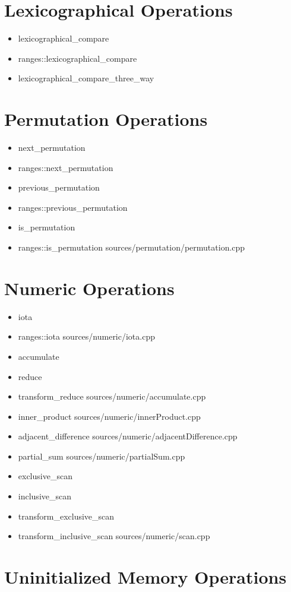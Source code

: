\documentclass{article}
\begin{document}
\section{Lexicographical Operations}
    \begin{itemize}
      \item lexicographical\_compare
      \item ranges::lexicographical\_compare
      \item lexicographical\_compare\_three\_way
    \end{itemize}
\section{Permutation Operations}
    \begin{itemize}
      \item next\_permutation
      \item ranges::next\_permutation
      \item previous\_permutation
      \item ranges::previous\_permutation
      \item is\_permutation
      \item ranges::is\_permutation
         {sources/permutation/permutation.cpp}
    \end{itemize}
\section{Numeric Operations}
    \begin{itemize}
      \item iota
      \item ranges::iota
         {sources/numeric/iota.cpp}
      \item accumulate
      \item reduce
      \item transform\_reduce
         {sources/numeric/accumulate.cpp}
      \item inner\_product
         {sources/numeric/innerProduct.cpp}
      \item adjacent\_difference
         {sources/numeric/adjacentDifference.cpp}
      \item partial\_sum
         {sources/numeric/partialSum.cpp}
      \item exclusive\_scan
      \item inclusive\_scan
      \item transform\_exclusive\_scan
      \item transform\_inclusive\_scan
         {sources/numeric/scan.cpp}
    \end{itemize}
\section{Uninitialized Memory Operations}
\end{document}
